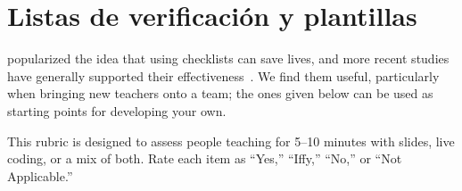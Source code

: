 \chapter{Listas de verificación y plantillas}\label{s:checklist}

\cite{Gawa2007} popularized the idea that using checklists can save lives,
and more recent studies have generally supported their effectiveness~\cite{Avel2013,Urba2014,Rams2019}.
We find them useful,
particularly when bringing new teachers onto a team;
the ones given below can be used as starting points for developing your own.


This rubric is designed to assess people teaching for 5--10 minutes
with slides, live coding, or a mix of both.
Rate each item as ``Yes,'' ``Iffy,'' ``No,'' or ``Not Applicable.''

